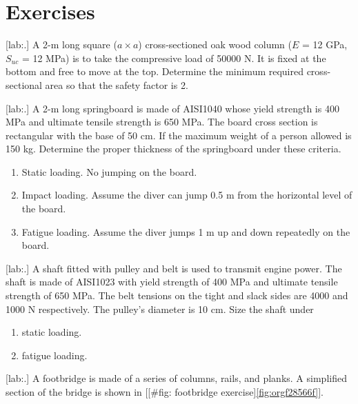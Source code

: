 \documentclass[a4paper,openany,12pt]{book}
\begin{document}
{{\section{Exercises}
\label{sec:orgc1bafb7}
[lab:.] A 2-m long square
(\(a \times a\)) cross-sectioned oak wood column (\(E\) = 12 GPa, \(S_{uc}\) =
12 MPa) is to take the compressive load of 50000 N. It is fixed at the
bottom and free to move at the top. Determine the minimum required
cross-sectional area so that the safety factor is 2.


[lab:.] A 2-m long springboard is
made of AISI1040 whose yield strength is 400 MPa and ultimate tensile
strength is 650 MPa. The board cross section is rectangular with the
base of 50 cm. If the maximum weight of a person allowed is 150 kg.
Determine the proper thickness of the springboard under these criteria.



\begin{enumerate}
\item Static loading. No jumping on the board.

\item Impact loading. Assume the diver can jump 0.5 m from the horizontal
level of the board.

\item Fatigue loading. Assume the diver jumps 1 m up and down repeatedly on
the board.
\end{enumerate}

[lab:.] A shaft fitted with pulley
and belt is used to transmit engine power. The shaft is made of AISI1023
with yield strength of 400 MPa and ultimate tensile strength of 650 MPa.
The belt tensions on the tight and slack sides are 4000 and 1000 N
respectively. The pulley's diameter is 10 cm. Size the shaft under



\begin{enumerate}
\item static loading.

\item fatigue loading.
\end{enumerate}

[lab:.] A
footbridge is made of a series of columns, rails, and planks. A
simplified section of the bridge is shown in
[[\#fig: footbridge exercise]\ref{fig:orgf28566f}].


}}
\end{document}
